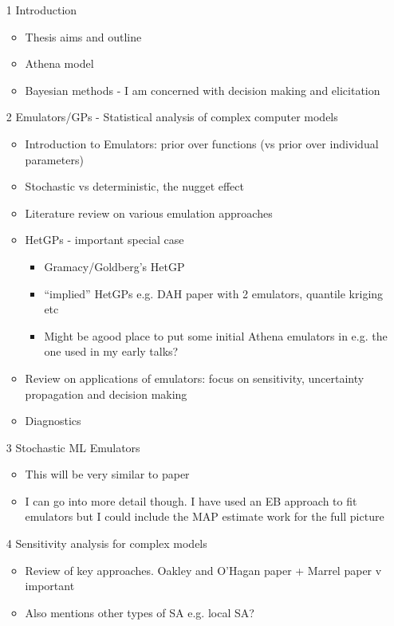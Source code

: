 \documentclass[12pt]{article}
\begin{document}
\begin{itemize}
	\item[1] Introduction
	\begin{itemize}
		\item Thesis aims and outline
		\item Athena model
		\item Bayesian methods - I am concerned with decision making and elicitation
	\end{itemize}
	\item[2] Emulators/GPs - Statistical analysis of complex computer models
	\begin{itemize}
		\item Introduction to Emulators: prior over functions (vs prior over individual parameters)
		\item Stochastic vs deterministic, the nugget effect
		\item Literature review on various emulation approaches
		\item HetGPs - important special case
		\begin{itemize}
			\item Gramacy/Goldberg's HetGP
			\item ``implied'' HetGPs e.g. DAH paper with 2 emulators, quantile kriging etc
			\item Might be agood place to put some initial Athena emulators in e.g. the one used in my early talks?
		\end{itemize}
		\item Review on applications of emulators: focus on sensitivity, uncertainty propagation and decision making
		\item Diagnostics
	\end{itemize}
	\item[3] Stochastic ML Emulators
	\begin{itemize}
		\item This will be very similar to paper
		\item I can go into more detail though. I have used an EB approach to fit emulators but I could include the MAP estimate work for the full picture
	\end{itemize}
	\item[4] Sensitivity analysis for complex models
	\begin{itemize}
		\item Review of key approaches. Oakley and O'Hagan paper + Marrel paper v important
		\item Also mentions other types of SA e.g. local SA?

\end{itemize}
\end{itemize}
\end{document}
